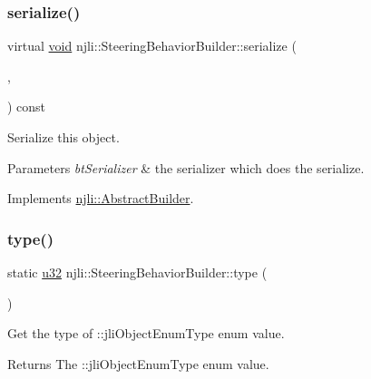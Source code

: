 \subsubsection{\texorpdfstring{serialize()}{serialize()}}
{\footnotesize\ttfamily virtual \mbox{\hyperlink{_thread_8h_af1e856da2e658414cb2456cb6f7ebc66}{void}} njli\+::\+Steering\+Behavior\+Builder\+::serialize (\begin{DoxyParamCaption}\item[{\mbox{\hyperlink{_thread_8h_af1e856da2e658414cb2456cb6f7ebc66}{void}} $\ast$}]{,  }\item[{bt\+Serializer $\ast$}]{ }\end{DoxyParamCaption}) const\hspace{0.3cm}{\ttfamily [virtual]}}

Serialize this object.


\begin{DoxyParams}{Parameters}
{\em bt\+Serializer} & the serializer which does the serialize. \\
\hline
\end{DoxyParams}


Implements \mbox{\hyperlink{classnjli_1_1_abstract_builder_ab66b774e02ccb9da554c9aab7fa6d981}{njli\+::\+Abstract\+Builder}}.

\mbox{\label{classnjli_1_1_steering_behavior_builder_a959a85a3a585926da5ce2de515ad4ffc}} 
\subsubsection{\texorpdfstring{type()}{type()}}
{\footnotesize\ttfamily static \mbox{\hyperlink{_util_8h_a10e94b422ef0c20dcdec20d31a1f5049}{u32}} njli\+::\+Steering\+Behavior\+Builder\+::type (\begin{DoxyParamCaption}{ }\end{DoxyParamCaption})\hspace{0.3cm}{\ttfamily [static]}}

Get the type of \+::jli\+Object\+Enum\+Type enum value.

\begin{DoxyReturn}{Returns}
The \+::jli\+Object\+Enum\+Type enum value. 
\end{DoxyReturn}



